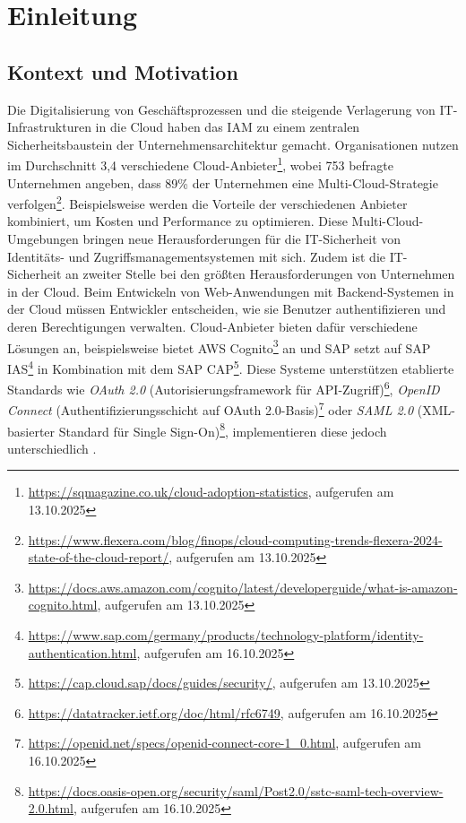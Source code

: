 \chapter{Einleitung}
\label{chap:expose}

\section{Kontext und Motivation}

Die Digitalisierung von Geschäftsprozessen und die steigende Verlagerung von IT-Infrastrukturen in die Cloud haben das \ac{IAM} zu einem zentralen Sicherheitsbaustein der Unternehmensarchitektur gemacht. Organisationen nutzen im Durchschnitt 3,4 verschiedene Cloud-Anbieter\footnote{\label{fn:sqmagazine}\url{https://sqmagazine.co.uk/cloud-adoption-statistics}, aufgerufen am 13.10.2025}, wobei 753 befragte Unternehmen angeben, dass 89\% der Unternehmen eine Multi-Cloud-Strategie verfolgen\footnote{\url{https://www.flexera.com/blog/finops/cloud-computing-trends-flexera-2024-state-of-the-cloud-report/}, aufgerufen am 13.10.2025}. Beispielsweise werden die Vorteile der verschiedenen Anbieter kombiniert, um Kosten und Performance zu optimieren. Diese Multi-Cloud-Umgebungen bringen neue Herausforderungen für die IT-Sicherheit von Identitäts- und Zugriffsmanagementsystemen mit sich. Zudem ist die IT-Sicherheit an zweiter Stelle bei den größten Herausforderungen von Unternehmen in der Cloud.
\newline
Beim Entwickeln von Web-Anwendungen mit Backend-Systemen in der Cloud müssen Entwickler entscheiden, wie sie Benutzer authentifizieren und deren Berechtigungen verwalten. Cloud-Anbieter bieten dafür verschiedene Lösungen an, beispielsweise bietet \ac{AWS} Cognito\footnote{\label{fn:whatcognito}\url{https://docs.aws.amazon.com/cognito/latest/developerguide/what-is-amazon-cognito.html}, aufgerufen am 13.10.2025} an und SAP setzt auf \ac{SAP IAS}\footnote{\label{fn:sapias}\url{https://www.sap.com/germany/products/technology-platform/identity-authentication.html}, aufgerufen am 16.10.2025} in Kombination mit dem \ac{SAP CAP}\footnote{\label{fn:sapcap}\url{https://cap.cloud.sap/docs/guides/security/}, aufgerufen am 13.10.2025}. Diese Systeme unterstützen etablierte Standards wie \textit{OAuth 2.0} (Autorisierungsframework für API-Zugriff)\footnote{\url{https://datatracker.ietf.org/doc/html/rfc6749}, aufgerufen am 16.10.2025}, \textit{OpenID Connect} (Authentifizierungsschicht auf OAuth 2.0-Basis)\footnote{\url{https://openid.net/specs/openid-connect-core-1_0.html}, aufgerufen am 16.10.2025} oder \textit{SAML 2.0} (XML-basierter Standard für Single Sign-On)\footnote{\url{https://docs.oasis-open.org/security/saml/Post2.0/sstc-saml-tech-overview-2.0.html}, aufgerufen am 16.10.2025}, implementieren diese jedoch unterschiedlich \citep{Ali2025}.
